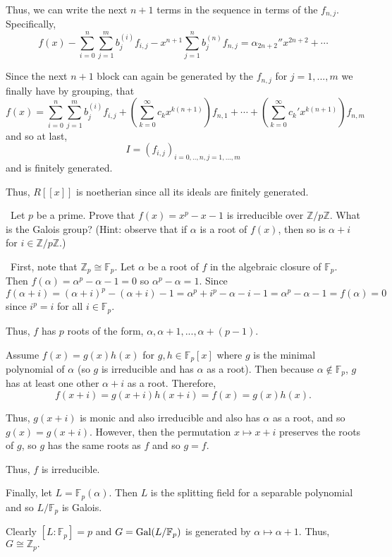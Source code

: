 \documentclass[12pt]{AlgebraQual}
\begin{document}
\begin{solution}
Thus, we can write the next $n+1$ terms in the sequence in terms of the $f_{n,j}$. Specifically,
$$f(x)-\sum_{i=0}^n\sum_{j=1}^mb_j^{(i)}f_{i,j}-x^{n+1}\sum_{j=1}^nb_j^{(n)}f_{n,j}=\alpha_{2n+2}''x^{2n+2}+\cdots$$

Since the next $n+1$ block can again be generated by the $f_{n,j}$ for $j=1,...,m$ we finally have by grouping, that $$f(x)=\sum_{i=0}^n\sum_{j=1}^mb_j^{(i)}f_{i,j}+\left(\sum_{k=0}^\infty c_kx^{k(n+1)}\right)f_{n,1}+\cdots+\left(\sum_{k=0}^\infty c_k'x^{k(n+1)}\right)f_{n,m}$$ and so at last, $$I=(f_{i,j})_{i=0,..,n,j=1,...,m}$$ and is finitely generated.

Thus, $R[[x]]$ is noetherian since all its ideals are finitely generated.

\end{solution}
\newpage



\begin{problem} $\,$
Let $p$ be a prime. Prove that $f(x)=x^p-x-1$ is irreducible over $\mathbb{Z}/p\mathbb{Z}$. What is the Galois group? (Hint: observe that if $\alpha$ is a root of $f(x)$, then so is $\alpha+i$ for $i\in\mathbb{Z}/p\mathbb{Z}$.)
\end{problem}


\begin{solution}$\,$
First, note that $\mathbb{Z}_p\cong\mathbb{F}_p$. Let $\alpha$ be a root of $f$ in the algebraic closure of $\mathbb{F}_p$. Then $f(\alpha)=\alpha^p-\alpha-1=0$ so $\alpha^p-\alpha=1$. Since $$f(\alpha+i)=(\alpha+i)^p-(\alpha+i)-1=\alpha^p+i^p-\alpha-i-1=\alpha^p-\alpha-1=f(\alpha)=0$$ since $i^p=i$ for all $i\in\mathbb{F}_p.$

Thus, $f$ has $p$ roots of the form, $\alpha,\alpha+1,...,\alpha+(p-1).$

Assume $f(x)=g(x)h(x)$ for $g,h\in\mathbb{F}_p[x]$ where $g$ is the minimal polynomial of $\alpha$ (so $g$ is irreducible and has $\alpha$ as a root). Then because $\alpha\notin\mathbb{F}_p$, $g$ has at least one other $\alpha+i$ as a root. Therefore, $$f(x+i)=g(x+i)h(x+i)=f(x)=g(x)h(x).$$

Thus, $g(x+i)$ is monic and also irreducible and also has $\alpha$ as a root, and so $g(x)=g(x+i)$. However, then the permutation $x\mapsto x+i$ preserves the roots of $g$, so $g$ has the same roots as $f$ and so $g=f.$

Thus, $f$ is irreducible.

Finally, let $L=\mathbb{F}_p(\alpha)$. Then $L$ is the splitting field for a separable polynomial and so $L/\mathbb{F}_p$ is Galois.

Clearly $[L:\mathbb{F}_p]=p$ and $G=\text{Gal}(L/\mathbb{F}_p)$ is generated by $\alpha\mapsto\alpha+1$. Thus, $G\cong\mathbb{Z}_p.$
\end{solution}
\newpage
\end{document}
